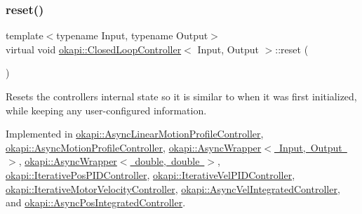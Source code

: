 \mbox{\label{classokapi_1_1ClosedLoopController_a7dd6ce28b3e38bdf987514a1b6c83c8c}} 
\subsubsection{\texorpdfstring{reset()}{reset()}}
{\footnotesize\ttfamily template$<$typename Input, typename Output$>$ \\
virtual void \mbox{\hyperlink{classokapi_1_1ClosedLoopController}{okapi\+::\+Closed\+Loop\+Controller}}$<$ Input, Output $>$\+::reset (\begin{DoxyParamCaption}{ }\end{DoxyParamCaption})\hspace{0.3cm}{\ttfamily [pure virtual]}}

Resets the controller\textquotesingle{}s internal state so it is similar to when it was first initialized, while keeping any user-\/configured information. 

Implemented in \mbox{\hyperlink{classokapi_1_1AsyncLinearMotionProfileController_a925381153aeda65c448489a8f2c3803c}{okapi\+::\+Async\+Linear\+Motion\+Profile\+Controller}}, \mbox{\hyperlink{classokapi_1_1AsyncMotionProfileController_a9ad15272defac4db5e2b318671eb3850}{okapi\+::\+Async\+Motion\+Profile\+Controller}}, \mbox{\hyperlink{classokapi_1_1AsyncWrapper_a9372a74580e5be429ecd65ec0e110c23}{okapi\+::\+Async\+Wrapper$<$ Input, Output $>$}}, \mbox{\hyperlink{classokapi_1_1AsyncWrapper_a9372a74580e5be429ecd65ec0e110c23}{okapi\+::\+Async\+Wrapper$<$ double, double $>$}}, \mbox{\hyperlink{classokapi_1_1IterativePosPIDController_a038da11f8e6e16139423e2284afa797c}{okapi\+::\+Iterative\+Pos\+P\+I\+D\+Controller}}, \mbox{\hyperlink{classokapi_1_1IterativeVelPIDController_a51607c29e072a672522a9e93bbd12410}{okapi\+::\+Iterative\+Vel\+P\+I\+D\+Controller}}, \mbox{\hyperlink{classokapi_1_1IterativeMotorVelocityController_a404105de7fd0e34dd50f09d47c8b110f}{okapi\+::\+Iterative\+Motor\+Velocity\+Controller}}, \mbox{\hyperlink{classokapi_1_1AsyncVelIntegratedController_aef78a032062241ece030d58407179912}{okapi\+::\+Async\+Vel\+Integrated\+Controller}}, and \mbox{\hyperlink{classokapi_1_1AsyncPosIntegratedController_a5858445747fe5a03f17f6fd83ee9aaaa}{okapi\+::\+Async\+Pos\+Integrated\+Controller}}.

